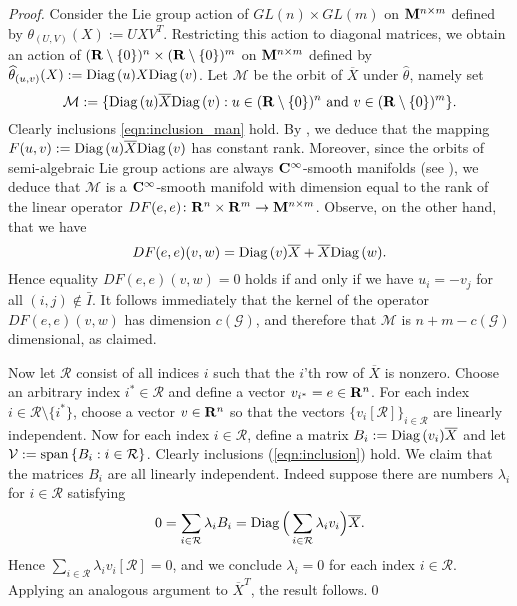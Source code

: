 \documentclass[smallextended,numbook]{svjour3}
\begin{document}
\begin{proof}
Consider the Lie group action of $GL(n)\times GL(m)$ on ${\bf M}^{n\times m}$ defined by 
$\theta_{(U,V)}(X) := U X V^T$. 
Restricting this action to diagonal matrices, we obtain an action of $({{\bf R}}\setminus \{0\})^{n}\times ({{\bf R}}\setminus \{0\})^{m}$ on ${\bf M}^{n\times m}$ defined by $\widehat{\theta}_{(u,v)}(X) := {\mbox{\rm Diag}\,}(u) X {\mbox{\rm Diag}\,}(v)$. Let $\mathcal{M}$ be the orbit of $\overline{X}$ under $\widehat{\theta}$, namely set 
$$\mathcal{M}:=\{{\mbox{\rm Diag}\,}(u) \overline{X} {\mbox{\rm Diag}\,}(v): u\in ({{\bf R}}\setminus \{0\})^{n}\textrm{ and } v\in({{\bf R}}\setminus \{0\})^{m} \}.$$
Clearly inclusions \eqref{eqn:inclusion_man} hold.
By \cite[Proposition~7.26]{Lee2}, we deduce that the mapping $F(u,v):= {\mbox{\rm Diag}\,}(u) \overline{X} {\mbox{\rm Diag}\,}(v)$ has constant rank.
Moreover, since the orbits of semi-algebraic Lie group actions are always ${\bf C}^{\infty}$-smooth manifolds (see \cite[Theorem B4]{Gib}), we deduce that $\mathcal{M}$ is a ${\bf C}^{\infty}$-smooth manifold with dimension equal to the rank of the linear operator $DF(e,e)\colon {{\bf R}}^n\times{{\bf R}}^m \to {\bf M}^{n\times m}$. Observe, on the other hand, that we have
$$DF(e,e)(v,w)= {\mbox{\rm Diag}\,}(v)\overline{X}+\overline{X}{\mbox{\rm Diag}\,}(w).$$
Hence equality $DF(e,e)(v,w)=0$ holds if and only if  we have $u_i=-v_j$ for all $(i,j)\notin \bar{I}$.  
It follows immediately that the kernel of the operator $DF(e,e)(v,w)$ has dimension $c(\mathcal{G})$, and therefore that $\mathcal{M}$ is $n+m-c(\mathcal{G})$ dimensional, as claimed.

Now let $\mathcal{R}$ consist of all indices $i$ such that the $i$'th row of $\overline{X}$ is nonzero. 
Choose an arbitrary index $i^{*}\in\mathcal{R}$ and define a vector $v_{i^{*}}=e\in{{\bf R}}^n$. For each index $i\in \mathcal{R}\setminus \{i^{*}\}$, choose a vector $v\in{{\bf R}}^n$ so that the vectors $\{v_i[\mathcal{R}]\}_{i\in\mathcal{R}}$ are linearly independent. Now for each index $i\in \mathcal{R}$,  define a matrix $B_i:={\mbox{\rm Diag}\,}(v_i) \overline{X}$ and let $\mathcal{V}:={\mbox{\rm span}\,} \{B_i: i\in\mathcal{R}\}$. Clearly inclusions (\ref{eqn:inclusion}) hold.
We claim that the matrices $B_i$ are all linearly independent. Indeed suppose there are numbers $\lambda_i$ for $i\in\mathcal{R}$ satisfying $$0=\sum_{i\in\mathcal{R}} \lambda_i B_i= {\mbox{\rm Diag}\,} \Big(\sum_{i\in\mathcal{R}} \lambda_i v_i\Big)\overline{X}.$$
Hence $\sum_{i\in\mathcal{R}} \lambda_i v_i[\mathcal{R}]=0$, and we conclude $\lambda_i=0$ for each index $i\in\mathcal{R}$. Applying an 
analogous argument to $\overline{X}^T$, the result follows.\qed
\end{proof}
\end{document}
